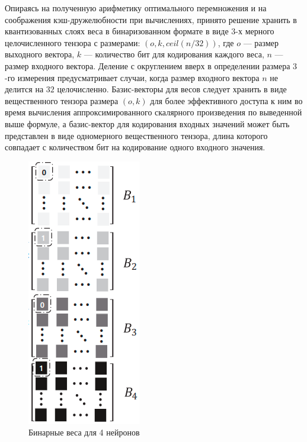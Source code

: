 Опираясь на полученную арифметику оптимального перемножения и на соображения кэш-дружелюбности при вычислениях, принято решение хранить в квантизованных слоях веса в бинаризованном формате в виде $3$-х мерного целочисленного тензора с размерами: $(o, k, ceil(n / 32))$, где $o$ — размер выходного вектора, $k$ — количество бит для кодирования каждого веса, $n$ — размер входного вектора. Деление с округлением вверх в определении размера $3$-го измерения предусматривает случаи, когда размер входного вектора $n$ не делится на $32$ целочисленно. Базис-векторы для весов следует хранить в виде вещественного тензора размера $(o, k)$ для более эффективного доступа к ним во время вычисления аппроксимированного скалярного произведения по выведенной выше формуле, а базис-вектор для кодирования входных значений может быть представлен в виде одномерного вещественного тензора, длина которого совпадает с количеством бит на кодирование одного входного значения.

\begin{figure}[H]
    \begin{center}
        \includegraphics[scale=0.35]{tex/inc/img/bindata.jpg}
        \caption{Бинарные веса для 4 нейронов}
    \end{center}
\end{figure}

